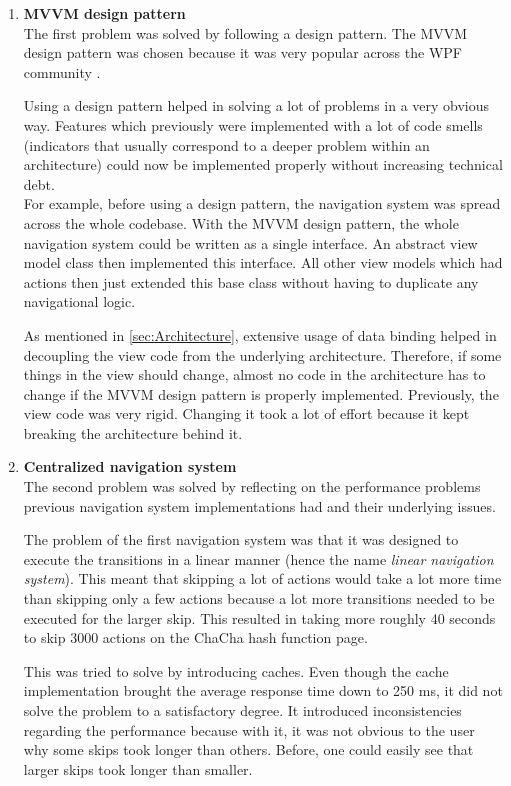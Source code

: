 \begin{enumerate}[label=(\labelenum{S}{{\arabic*}}), wide, labelwidth=!, labelindent=0pt]
\setlength{\parskip}{0pt}

\item \textbf{MVVM design pattern}\\
The first problem was solved by following a design pattern. The MVVM design pattern was chosen because it was very popular across the WPF community \cite{mvvm-wpf}. 

Using a design pattern helped in solving a lot of problems in a very obvious way. Features which previously were implemented with a lot of code smells (indicators that usually correspond to a deeper problem within an architecture) could now be implemented properly without increasing technical debt.\\
For example, before using a design pattern, the navigation system was spread across the whole codebase. With the MVVM design pattern, the whole navigation system could be written as a single interface. An abstract view model class then implemented this interface. All other view models which had actions then just extended this base class without having to duplicate any navigational logic.

As mentioned in \autoref{sec:Architecture}, extensive usage of data binding helped in decoupling the view code from the underlying architecture. Therefore, if some things in the view should change, almost no code in the architecture has to change if the MVVM design pattern is properly implemented. Previously, the view code was very rigid. Changing it took a lot of effort because it kept breaking the architecture behind it.

\item \textbf{Centralized navigation system}\\
The second problem was solved by reflecting on the performance problems previous navigation system implementations had and their underlying issues.

The problem of the first navigation system was that it was designed to execute the transitions in a linear manner (hence the name \textit{linear navigation system}). This meant that skipping a lot of actions would take a lot more time than skipping only a few actions because a lot more transitions needed to be executed for the larger skip. This resulted in taking more roughly 40 seconds to skip 3000 actions on the ChaCha hash function page.

This was tried to solve by introducing caches. Even though the cache implementation brought the average response time down to 250 ms, it did not solve the problem to a satisfactory degree. It introduced inconsistencies regarding the performance because with it, it was not obvious to the user why some skips took longer than others. Before, one could easily see that larger skips took longer than smaller.


\end{enumerate}
